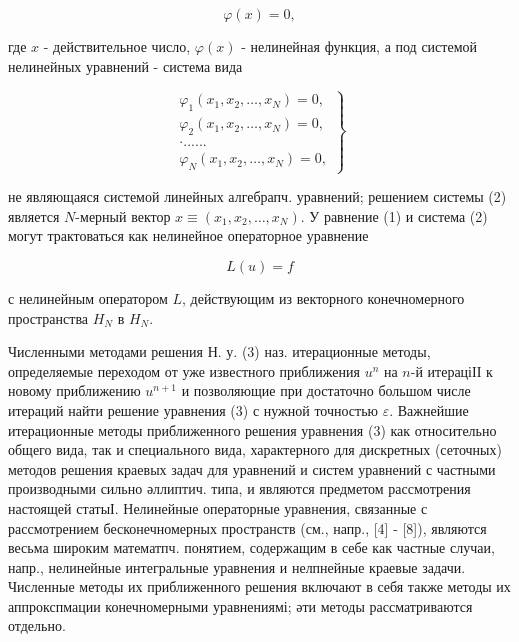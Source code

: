 \documentclass[10pt]{article}
\begin{document}
\[

\varphi(x)=0,

\]



где $x$ - действительное число, $\varphi(x)$ - нелинейная функция, а под системой нелинейных уравнений - система вида



\[

\left.\begin{array}{c}

\varphi_{1}\left(x_{1}, x_{2}, \ldots, x_{N}\right)=0, \\

\varphi_{2}\left(x_{1}, x_{2}, \ldots, x_{N}\right)=0, \\

\cdot . . . . . . \\

\varphi_{N}\left(x_{1}, x_{2}, \ldots, x_{N}\right)=0,

\end{array}\right\}

\]



не являющаяся системой линейных алгебрапч. уравнений; решением системы (2) является $N$-мерный вектор $x \equiv\left(x_{1}, x_{2}, \ldots, x_{N}\right)$. У равнение (1) и система (2) могут трактоваться как нелинейное операторное уравнение



\[

L(u)=f

\]



с нелинейным оператором $L$, действующим из векторного конечномерного пространства $H_{N}$ в $H_{N}$.



Численными методами решения Н. у. (3) наз. итерационные методы, определяемые переходом от уже известного приближения $u^{n}$ на $n$-й итераціІІ к новому приближению $u^{n+1}$ и позволяющие при достаточно большом числе итераций найти решение уравнения (3) с нужной точностью $\varepsilon$. Важнейшие итерационные методы приближенного решения уравнения (3) как относительно общего вида, так и специального вида, характерного для дискретных (сеточных) методов решения краевых задач для уравнений и систем уравнений с частными производными сильно әллиптич. типа, и являются предметом рассмотрения настоящей статыІ. Нелинейные операторные уравнения, связанные с рассмотрением бесконечномерных пространств (см., напр., [4] - [8]), являются весьма широким математпч. понятием, содержащим в себе как частные случаи, напр., нелинейные интегральные уравнения и нелпнейные краевые задачи. Численные методы их приближенного решения включают в себя также методы их аппрокспмации конечномерными уравнениямі; әти методы рассматриваются отдельно.
\end{document}
